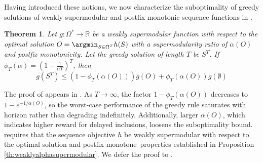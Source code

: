 \documentclass{article} %
\newtheorem{theorem}{Theorem}[section]
\begin{document}


Having introduced these notions, we now characterize the suboptimality of greedy solutions of weakly supermodular and 
postfix monotonic sequence functions in .
\begin{theorem} \label{th:suboptgreedy}
    Let $g: \Omega^* \to \mathbb{R}$ be a weakly supermodular function with respect to the optimal solution $O = \argmin_{S \in \Omega^T} h(S)$ with a supermodularity ratio of $\alpha(O)$ and 
    postfix monotonicity. Let the greedy solution of length $T$ be $S^T$. If $\phi_T(\alpha) =  \left(1 - \frac{1}{\alpha T}\right)^T$, then
    \begin{equation*}
        g(S^T) \leq  \left(1 - \phi_T(\alpha(O))\right)
        g(O) +  \phi_T(\alpha(O))g(\emptyset)
    \end{equation*}
\end{theorem}

The proof of  appears in . As $T \to \infty$, the factor $1 - \phi_T(\alpha(O))$ decreases to $1 - e^{-1/\alpha(O)}$, so the worst-case performance of the greedy rule saturates with horizon rather than degrading indefinitely. Additionally, larger $\alpha(O)$, which indicates higher reward for delayed inclusions, loosens the suboptimality bound.  
 requires that the sequence objective $h$ be weakly supermodular with respect to the optimal solution and postfix monotone--properties established in Proposition \ref{th:weaklyalphasupermodular}. We defer the proof to .
\end{document}
